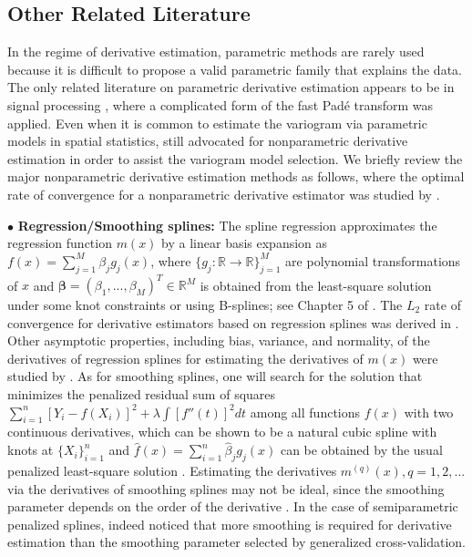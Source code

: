 \documentclass{uwstat572}
\theoremstyle{definition}
\renewcommand{\hat}{\widehat}
\theoremstyle{theorem}
\begin{document}
\subsection{Other Related Literature}
\label{Sec:related_work}

In the regime of derivative estimation, parametric methods are rarely used because it is difficult to propose a valid parametric family that explains the data. The only related literature on parametric derivative estimation appears to be in signal processing \citep{belkic2018validation}, where a complicated form of the fast Pad\'e transform was applied. Even when it is common to estimate the variogram via parametric models in spatial statistics, \cite{gorsich2000variogram} still advocated for nonparametric derivative estimation in order to assist the variogram model selection. We briefly review the major nonparametric derivative estimation methods as follows, where the optimal rate of convergence for a nonparametric derivative estimator was studied by \cite{stone1980optimal,stone1982optimal}. 

$\bullet$ {\bf Regression/Smoothing splines:} The spline regression \citep{deboor1968splines} approximates the regression function $m(x)$ by a linear basis expansion as $f(x) = \sum_{j=1}^M \beta_j g_j(x)$, where $\{g_j:\mathbb{R}\to \mathbb{R}\}_{j=1}^M$ are polynomial transformations of $x$ and $\bm{\beta} = (\beta_1,...,\beta_M)^T \in \mathbb{R}^M$ is obtained from the least-square solution under some knot constraints or using B-splines; see Chapter 5 of \cite{hastie2009elements}. The $L_2$ rate of convergence for derivative estimators based on regression splines was derived in \cite{stone1985additive}. Other asymptotic properties, including bias, variance, and normality, of the derivatives of regression splines for estimating the derivatives of $m(x)$ were studied by \cite{zhou2000derivative}. As for smoothing splines, one will search for the solution that minimizes the penalized residual sum of squares $\sum_{i=1}^n \left[Y_i-f(X_i)\right]^2 + \lambda \int \left[f''(t)\right]^2 dt$ among all functions $f(x)$ with two continuous derivatives, which can be shown to be a natural cubic spline with knots at $\{X_i\}_{i=1}^n$ and $\hat{f}(x)=\sum_{i=1}^n \hat{\beta}_j g_j(x)$ can be obtained by the usual penalized least-square solution \citep{hastie2009elements}. Estimating the derivatives $m^{(q)}(x), q=1,2,...$ via the derivatives of smoothing splines may not be ideal, since the smoothing parameter depends on the order of the derivative \citep{wahba1990optimal}. In the case of semiparametric penalized splines, \cite{jarrow2004estimating} indeed noticed that more smoothing is required for derivative estimation than the smoothing parameter selected by generalized cross-validation.
\end{document}
